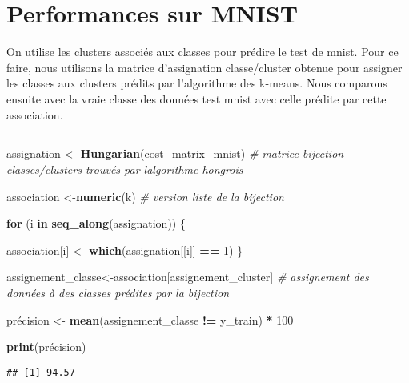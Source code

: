 \documentclass[
]{article}
\newenvironment{Shaded}{\begin{snugshade}}{\end{snugshade}}
\newcommand{\CommentTok}[1]{\textcolor[rgb]{0.56,0.35,0.01}{\textit{#1}}}
\newcommand{\ControlFlowTok}[1]{\textcolor[rgb]{0.13,0.29,0.53}{\textbf{#1}}}
\newcommand{\DecValTok}[1]{\textcolor[rgb]{0.00,0.00,0.81}{#1}}
\newcommand{\FunctionTok}[1]{\textcolor[rgb]{0.13,0.29,0.53}{\textbf{#1}}}
\newcommand{\NormalTok}[1]{#1}
\newcommand{\OtherTok}[1]{\textcolor[rgb]{0.56,0.35,0.01}{#1}}
\newcommand{\SpecialCharTok}[1]{\textcolor[rgb]{0.81,0.36,0.00}{\textbf{#1}}}
\begin{document}
\hypertarget{performances-sur-mnist}{%
\section{Performances sur MNIST}\label{performances-sur-mnist}}

On utilise les clusters associés aux classes pour prédire le test de
mnist. Pour ce faire, nous utilisons la matrice d'assignation
classe/cluster obtenue pour assigner les classes aux clusters prédits
par l'algorithme des k-means. Nous comparons ensuite avec la vraie
classe des données test mnist avec celle prédite par cette association.

\hypertarget{section-2}{%
\subsection{}\label{section-2}}

\begin{Shaded}
\begin{Highlighting}[]
\NormalTok{assignation }\OtherTok{\textless{}{-}} \FunctionTok{Hungarian}\NormalTok{(cost\_matrix\_mnist) }\CommentTok{\# matrice bijection classes/clusters trouvés par l\textquotesingle{}algorithme hongrois}

\NormalTok{association }\OtherTok{\textless{}{-}}\FunctionTok{numeric}\NormalTok{(k) }\CommentTok{\# version liste de la bijection}

\ControlFlowTok{for}\NormalTok{ (i }\ControlFlowTok{in} \FunctionTok{seq\_along}\NormalTok{(assignation)) \{}
  
\NormalTok{  association[i] }\OtherTok{\textless{}{-}} \FunctionTok{which}\NormalTok{(assignation[[i]] }\SpecialCharTok{==} \DecValTok{1}\NormalTok{)}
\NormalTok{\}}

\NormalTok{assignement\_classe}\OtherTok{\textless{}{-}}\NormalTok{association[assignement\_cluster] }\CommentTok{\# assignement des données à des classes prédites par la bijection}

\NormalTok{précision }\OtherTok{\textless{}{-}} \FunctionTok{mean}\NormalTok{(assignement\_classe }\SpecialCharTok{!=}\NormalTok{ y\_train) }\SpecialCharTok{*} \DecValTok{100} 

\FunctionTok{print}\NormalTok{(précision)}
\end{Highlighting}
\end{Shaded}

\begin{verbatim}
## [1] 94.57
\end{verbatim}
\end{document}

